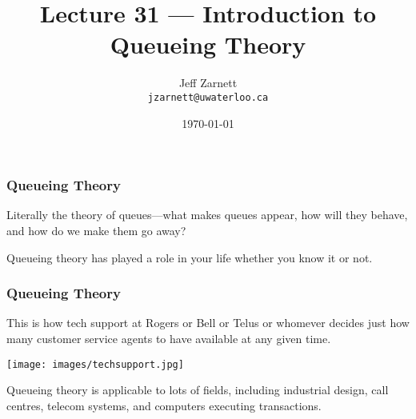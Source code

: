 

\title{Lecture 31 --- Introduction to Queueing Theory}

\author{Jeff Zarnett\\ \small \texttt{jzarnett@uwaterloo.ca}}
\date{\today}




\begin{frame}
  \titlepage

 \end{frame}



\begin{frame}
\frametitle{Queueing Theory}

Literally the theory of queues---what makes queues appear, how will they behave, and how do we make them go away? 


Queueing theory has played a role in your life whether you know it or not. 



\end{frame}

\begin{frame}
\frametitle{Queueing Theory}

This is how tech support at Rogers or Bell or Telus or whomever decides just how many customer service agents to have available at any given time. 

\begin{center}
	\texttt{[image: images/techsupport.jpg]}
\end{center}

Queueing theory is applicable to lots of fields, including industrial design, call centres, telecom systems, and computers executing transactions. 

\end{frame}



